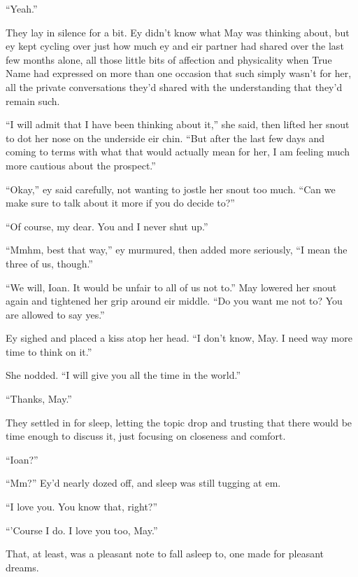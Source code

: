 ``Yeah.''

They lay in silence for a bit. Ey didn't know what May was thinking about, but ey kept cycling over just how much ey and eir partner had shared over the last few months alone, all those little bits of affection and physicality when True Name had expressed on more than one occasion that such simply wasn't for her, all the private conversations they'd shared with the understanding that they'd remain such.

``I will admit that I have been thinking about it,'' she said, then lifted her snout to dot her nose on the underside eir chin. ``But after the last few days and coming to terms with what that would actually mean for her, I am feeling much more cautious about the prospect.''

``Okay,'' ey said carefully, not wanting to jostle her snout too much. ``Can we make sure to talk about it more if you do decide to?''

``Of course, my dear. You and I never shut up.''

``Mmhm, best that way,'' ey murmured, then added more seriously, ``I mean the three of us, though.''

``We will, Ioan. It would be unfair to all of us not to.'' May lowered her snout again and tightened her grip around eir middle. ``Do you want me not to? You are allowed to say yes.''

Ey sighed and placed a kiss atop her head. ``I don't know, May. I need way more time to think on it.''

She nodded. ``I will give you all the time in the world.''

``Thanks, May.''

They settled in for sleep, letting the topic drop and trusting that there would be time enough to discuss it, just focusing on closeness and comfort.

``Ioan?''

``Mm?'' Ey'd nearly dozed off, and sleep was still tugging at em.

``I love you. You know that, right?''

``'Course I do. I love you too, May.''

That, at least, was a pleasant note to fall asleep to, one made for pleasant dreams.
